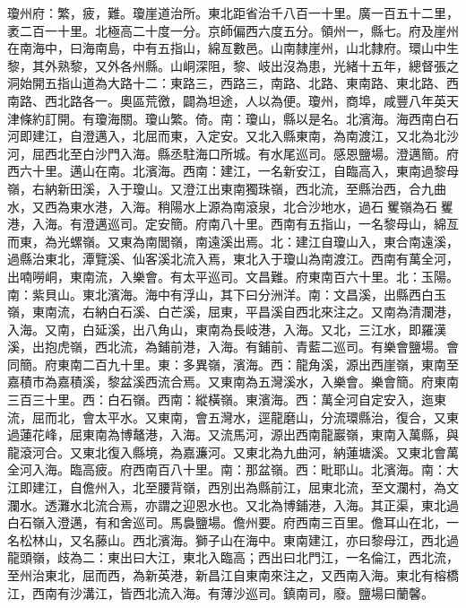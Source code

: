 \begin{pinyinscope}
瓊州府：繁，疲，難。瓊崖道治所。東北距省治千八百一十里。廣一百五十二里，袤二百一十里。北極高二十度一分。京師偏西六度五分。領州一，縣七。府及崖州在南海中，曰海南島，中有五指山，綿亙數邑。山南隸崖州，山北隸府。環山中生黎，其外熟黎，又外各州縣。山峒深阻，黎、岐出沒為患，光緒十五年，總督張之洞始開五指山道為大路十二：東路三，西路三，南路、北路、東南路、東北路、西南路、西北路各一。奧區荒徼，闢為坦途，人以為便。瓊州，商埠，咸豐八年英天津條約訂開。有瓊海關。瓊山繁。倚。南：瓊山，縣以是名。北濱海。海西南白石河即建江，自澄邁入，北屈而東，入定安。又北入縣東南，為南渡江，又北為北沙河，屈西北至白沙門入海。縣丞駐海口所城。有水尾巡司。感恩鹽場。澄邁簡。府西六十里。邁山在南。北濱海。西南：建江，一名新安江，自臨高入，東南過黎母嶺，右納新田溪，入于瓊山。又澄江出東南獨珠嶺，西北流，至縣治西，合九曲水，又西為東水港，入海。稍陽水上源為南滾泉，北合沙地水，過石矍嶺為石矍港，入海。有澄邁巡司。定安簡。府南八十里。西南有五指山，一名黎母山，綿亙而東，為光螺嶺。又東為南閭嶺，南遠溪出焉。北：建江自瓊山入，東合南遠溪，過縣治東北，潭覽溪、仙客溪北流入焉，東北入于瓊山為南渡江。西南有萬全河，出喃嘮峒，東南流，入樂會。有太平巡司。文昌難。府東南百六十里。北：玉陽。南：紫貝山。東北濱海。海中有浮山，其下曰分洲洋。南：文昌溪，出縣西白玉嶺，東南流，右納白石溪、白芒溪，屈東，平昌溪自西北來注之。又南為清瀾港，入海。又南，白延溪，出八角山，東南為長岐港，入海。又北，三江水，即羅漢溪，出抱虎嶺，西北流，為鋪前港，入海。有鋪前、青藍二巡司。有樂會鹽場。會同簡。府東南二百九十里。東：多異嶺，濱海。西：龍角溪，源出西崖嶺，東南至嘉積市為嘉積溪，黎盆溪西流合焉。又東南為五灣溪水，入樂會。樂會簡。府東南三百三十里。西：白石嶺。西南：縱橫嶺。東濱海。西：萬全河自定安入，迤東流，屈而北，會太平水。又東南，會五灣水，逕龍磨山，分流環縣治，復合，又東過蓮花峰，屈東南為博鼇港，入海。又流馬河，源出西南龍巖嶺，東南入萬縣，與龍滾河合。又東北復入縣境，為嘉濂河。又東北為九曲河，納蓮塘溪。又東北會萬全河入海。臨高疲。府西南百八十里。南：那盆嶺。西：毗耶山。北濱海。南：大江即建江，自儋州入，北至腰背嶺，西別出為縣前江，屈東北流，至文瀾村，為文瀾水。透灘水北流合焉，亦謂之迎恩水也。又北為博鋪港，入海。其正渠，東北過白石嶺入澄邁，有和舍巡司。馬裊鹽場。儋州要。府西南三百里。儋耳山在北，一名松林山，又名藤山。西北濱海。獅子山在海中。東南建江，亦曰黎母江，西北過龍頭嶺，歧為二：東出曰大江，東北入臨高；西出曰北門江，一名倫江，西北流，至州治東北，屈而西，為新英港，新昌江自東南來注之，又西南入海。東北有榕橋江，西南有沙溝江，皆西北流入海。有薄沙巡司。鎮南司，廢。鹽場曰蘭馨。


\end{pinyinscope}
